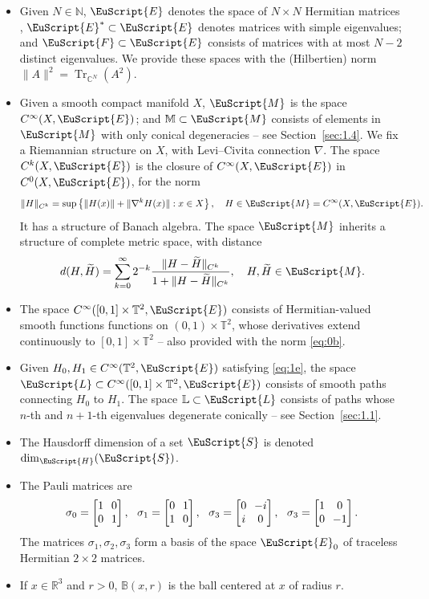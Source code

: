 \documentclass[JEP,XML,SOM,Unicode,NoFloatCountersInSection]{cedram}
\let\pazocal\EuScript
\let\sep:
\theoremstyle{definition}
\DeclareMathOperator{\Tr}{Tr}
\newcommand{\FF}{\pazocal{F}}
\newcommand{\EE}{\pazocal{E}}
\newcommand{\MM}{\pazocal{M}}
\newcommand{\LL}{{\pazocal{L}}}
\newcommand{\HH}{\pazocal{H}}
\newcommand{\SSS}{{\pazocal{S}}}
\newcommand{\Bb}{\mathbb{B}}
\newcommand{\C}{\mathbb{C}}
\newcommand{\Ll}{\mathbb{L}}
\newcommand{\R}{\mathbb{R}}
\newcommand{\N}{\mathbb{N}}
\newcommand{\Mm}{\mathbb{M}}
\newcommand{\Tt}{{\mathbb{T}}}
\newcommand{\tH}{{\widetilde{H}}}
\newcommand{\matrice}[1]{\arraycolsep3.5pt\begin{bmatrix}#1\end{bmatrix}}
\begin{document}
\label{sec:1.6}
\begin{itemize}
\item Given $N \in \N$, $\EE$ denotes the space of $N \times N$ Hermitian matrices , $\EE^* \subset \EE$ denotes matrices with simple eigenvalues; and $\FF \subset \EE$ consists of matrices with at most $N-2$ distinct eigenvalues. We provide these spaces with the (Hilbertien) norm $\|A\|^2 = \Tr_{\C^N}(A^2)$.
\item Given a smooth compact manifold $X$, $\MM$ is the space $C^\infty(X,\EE)$; and $\Mm \subset \MM$ consists of elements in $\MM$ with only conical degeneracies -- see Section~\ref{sec:1.4}. We fix a Riemannian structure on $X$, with Levi--Civita connection $\nabla$. The space $C^k(X,\EE)$ is the closure of $C^\infty(X,\EE)$ in $C^0(X,\EE)$, for the norm
\begin{equation*}
\| H \|_{C^k} = \sup \left\{\| H(x)\| +\| \nabla^k H(x)\|\sep x \in X \right\}, \quad H \in \MM = C^\infty(X,\EE).
\end{equation*}
It has a structure of Banach algebra. The space $\MM$ inherits a structure of complete metric space, with distance
\begin{equation}\label{eq:0b}
d(H,\tH) = \sum_{k=0}^\infty 2^{-k} \dfrac{\| H-\tH \|_{C^k}}{1+\| H-\tH \|_{C^k}}, \quad H, \tH \in \MM.
\end{equation}
\item The space $C^\infty([0,1] \times \Tt^2,\EE)$ consists of Hermitian-valued smooth functions functions on $(0,1) \times \Tt^2$, whose derivatives extend continuously to $[0,1] \times \Tt^2$ -- also provided with the norm \eqref{eq:0b}.
\item Given $H_0, H_1 \in C^\infty(\Tt^2, \EE)$ satisfying \eqref{eq:1e}, the space $\LL \subset C^\infty([0,1] \times \Tt^2,\EE)$ consists of smooth paths connecting $H_0$ to $H_1$. The space $\Ll \subset \LL$ consists of paths whose $n$-th and $n+1$-th eigenvalues degenerate conically -- see Section~\ref{sec:1.1}.
\item The Hausdorff dimension of a set $\SSS$ is denoted $\dim_\HH(\SSS)$.
\item The Pauli matrices are
\begin{equation*}
\sigma_0 = \matrice{1 & 0 \\ 0 & 1}, \ \ \sigma_1 = \matrice{0 & 1 \\ 1 & 0}, \ \ \sigma_3 = \matrice{0 & -i \\ i & 0}, \ \ \sigma_3 = \matrice{1 & 0 \\ 0 & -1}.
\end{equation*}
The matrices $\sigma_1, \sigma_2, \sigma_3$ form a basis of the space $\EE_0$ of traceless Hermitian $2 \times 2$ matrices.
\item If $x \in \R^3$ and $r > 0$, $\Bb(x,r)$ is the ball centered at $x$ of radius $r$.
\end{itemize}
\end{document}
